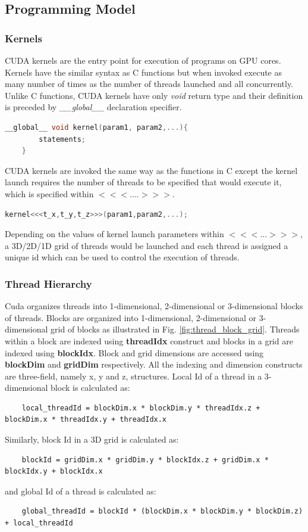 \documentclass[MTech]{iitmdiss}
\begin{document}
\subsection{Programming Model}
\subsubsection{Kernels} CUDA kernels are the entry point for execution of programs on GPU cores. Kernels have the similar syntax as C functions but when invoked execute as many number of times as the number of threads launched and all concurrently. Unlike C functions, CUDA kernels have only \textit{void} return type and their definition is preceded by  \textit{\_\_global\_\_} declaration specifier.  

\begin{lstlisting}[language=C++]
    __global__ void kernel(param1, param2,...){
        statements;
    }
\end{lstlisting}

CUDA kernels are invoked the same way as the functions in C except the kernel launch requires the number of threads to be specified that would execute it, which is specified within $<<<....>>>$.
\begin{lstlisting}[language=c++]
        kernel<<<t_x,t_y,t_z>>>(param1,param2,...);
\end{lstlisting}
 
Depending on the values of kernel launch parameters within $<<<...>>>$, a 3D/2D/1D grid of threads would be launched and each thread is assigned a unique id which can be used to control the execution of threads. 

\subsubsection{Thread Hierarchy}
Cuda organizes threads into 1-dimensional, 2-dimensional or 3-dimensional blocks of threads. Blocks are organized into 1-dimensional, 2-dimensional or 3-dimensional grid of blocks as illustrated in Fig. \ref{fig:thread_block_grid}. Threads within a block are indexed using \textbf{threadIdx} construct and blocks in a grid are indexed using \textbf{blockIdx}. Block and grid dimensions are accessed using \textbf{blockDim} and \textbf{gridDim} respectively. All the indexing and dimension constructs are three-field, namely x, y and z, structures. Local Id of a thread in a 3-dimensional block is calculated as:
\begin{lstlisting}
    local_threadId = blockDim.x * blockDim.y * threadIdx.z + blockDim.x * threadIdx.y + threadIdx.x
\end{lstlisting}
Similarly, block Id in a 3D grid is calculated as:
\begin{lstlisting}
    blockId = gridDim.x * gridDim.y * blockIdx.z + gridDim.x * blockIdx.y + blockIdx.x
\end{lstlisting}
and global Id of a thread is calculated as: 
\begin{lstlisting}
    global_threadId = blockId * (blockDim.x * blockDim.y * blockDim.z) + local_threadId
\end{lstlisting}
\end{document}
